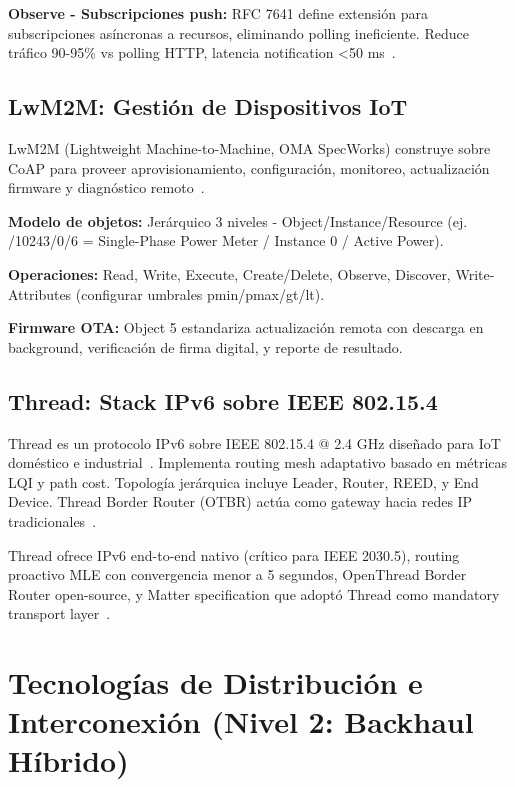 \textbf{Observe - Subscripciones push:} RFC 7641 define extensión para subscripciones asíncronas a recursos, eliminando polling ineficiente. Reduce tráfico 90-95\% vs polling HTTP, latencia notification <50 ms~\cite{shelby6LoWPANWirelessEmbedded2009}.

\subsection{LwM2M: Gestión de Dispositivos IoT}

LwM2M (Lightweight Machine-to-Machine, OMA SpecWorks) construye sobre CoAP para proveer aprovisionamiento, configuración, monitoreo, actualización firmware y diagnóstico remoto~\cite{haEnablingDynamicLightweight2018,karimiIIoTCommunicationProtocols2025}.

\textbf{Modelo de objetos:} Jerárquico 3 niveles - Object/Instance/Resource (ej. /10243/0/6 = Single-Phase Power Meter / Instance 0 / Active Power).

\textbf{Operaciones:} Read, Write, Execute, Create/Delete, Observe, Discover, Write-Attributes (configurar umbrales pmin/pmax/gt/lt).

\textbf{Firmware OTA:} Object 5 estandariza actualización remota con descarga en background, verificación de firma digital, y reporte de resultado.

\subsection{Thread: Stack IPv6 sobre IEEE 802.15.4}

Thread es un protocolo IPv6 sobre IEEE 802.15.4 @ 2.4 GHz diseñado para IoT doméstico e industrial~\cite{abdulsalamOverviewRecentWireless2024}. Implementa routing mesh adaptativo basado en métricas LQI y path cost. Topología jerárquica incluye Leader, Router, REED, y End Device. Thread Border Router (OTBR) actúa como gateway hacia redes IP tradicionales~\cite{choudharyInternetThingsComprehensive2024,openthread2024}.

Thread ofrece IPv6 end-to-end nativo (crítico para IEEE 2030.5), routing proactivo MLE con convergencia menor a 5 segundos, OpenThread Border Router open-source, y Matter specification que adoptó Thread como mandatory transport layer~\cite{threadMatterConvergence2024}.

\section{Tecnologías de Distribución e Interconexión (Nivel 2: Backhaul Híbrido)}

